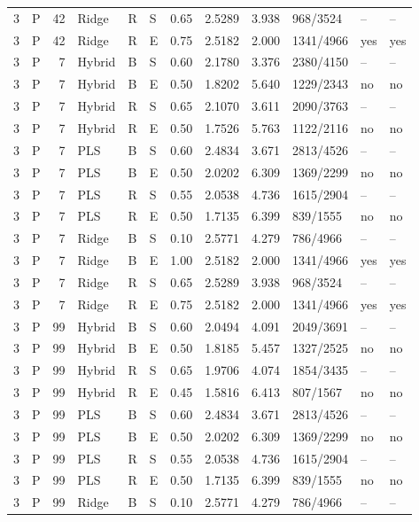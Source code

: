 \documentclass[10pt,a4paper]{article}
\begin{document}
\begin{landscape}
\begin{longtable}{rlrlllrrrlll}
3 & P & 42 & Ridge & R & S & 0.65 & 2.5289 & 3.938 & 968/3524 & -- & -- \\
3 & P & 42 & Ridge & R & E & 0.75 & 2.5182 & 2.000 & 1341/4966 & yes & yes \\
3 & P & 7 & Hybrid & B & S & 0.60 & 2.1780 & 3.376 & 2380/4150 & -- & -- \\
3 & P & 7 & Hybrid & B & E & 0.50 & 1.8202 & 5.640 & 1229/2343 & no & no \\
3 & P & 7 & Hybrid & R & S & 0.65 & 2.1070 & 3.611 & 2090/3763 & -- & -- \\
3 & P & 7 & Hybrid & R & E & 0.50 & 1.7526 & 5.763 & 1122/2116 & no & no \\
3 & P & 7 & PLS & B & S & 0.60 & 2.4834 & 3.671 & 2813/4526 & -- & -- \\
3 & P & 7 & PLS & B & E & 0.50 & 2.0202 & 6.309 & 1369/2299 & no & no \\
3 & P & 7 & PLS & R & S & 0.55 & 2.0538 & 4.736 & 1615/2904 & -- & -- \\
3 & P & 7 & PLS & R & E & 0.50 & 1.7135 & 6.399 & 839/1555 & no & no \\
3 & P & 7 & Ridge & B & S & 0.10 & 2.5771 & 4.279 & 786/4966 & -- & -- \\
3 & P & 7 & Ridge & B & E & 1.00 & 2.5182 & 2.000 & 1341/4966 & yes & yes \\
3 & P & 7 & Ridge & R & S & 0.65 & 2.5289 & 3.938 & 968/3524 & -- & -- \\
3 & P & 7 & Ridge & R & E & 0.75 & 2.5182 & 2.000 & 1341/4966 & yes & yes \\
3 & P & 99 & Hybrid & B & S & 0.60 & 2.0494 & 4.091 & 2049/3691 & -- & -- \\
3 & P & 99 & Hybrid & B & E & 0.50 & 1.8185 & 5.457 & 1327/2525 & no & no \\
3 & P & 99 & Hybrid & R & S & 0.65 & 1.9706 & 4.074 & 1854/3435 & -- & -- \\
3 & P & 99 & Hybrid & R & E & 0.45 & 1.5816 & 6.413 & 807/1567 & no & no \\
3 & P & 99 & PLS & B & S & 0.60 & 2.4834 & 3.671 & 2813/4526 & -- & -- \\
3 & P & 99 & PLS & B & E & 0.50 & 2.0202 & 6.309 & 1369/2299 & no & no \\
3 & P & 99 & PLS & R & S & 0.55 & 2.0538 & 4.736 & 1615/2904 & -- & -- \\
3 & P & 99 & PLS & R & E & 0.50 & 1.7135 & 6.399 & 839/1555 & no & no \\
3 & P & 99 & Ridge & B & S & 0.10 & 2.5771 & 4.279 & 786/4966 & -- & -- \\

\end{longtable}
\end{landscape}
\end{document}
